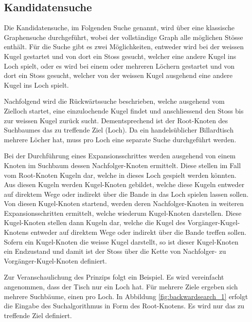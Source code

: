\subsection{Kandidatensuche}\label{sec:kandidatensuche}
Die Kandidatensuche, im Folgenden Suche genannt, wird über eine klassische Graphensuche durchgeführt, wobei der vollständige
Graph alle möglichen Stösse enthält.
Für die Suche gibt es zwei Möglichkeiten, entweder wird bei der weissen Kugel gestartet und von dort ein Stoss gesucht,
welcher eine andere Kugel ins Loch spielt, oder es wird bei einem oder mehreren Löchern gestartet und von dort ein Stoss gesucht,
welcher von der weissen Kugel ausgehend eine andere Kugel ins Loch spielt.

Nachfolgend wird die Rückwärtssuche beschrieben, welche ausgehend vom Zielloch startet, eine einzulochende Kugel findet
und anschliessend den Stoss bis zur weissen Kugel zurück sucht.
Dementsprechend ist der Root-Knoten des Suchbaumes das zu treffende Ziel (Loch).
Da ein handelsüblicher Billardtisch mehrere Löcher hat, muss pro Loch eine separate Suche durchgeführt werden.

Bei der Durchführung eines Expansionsschrittes werden ausgehend von einem Knoten im Suchbaum dessen Nachfolger-Knoten ermittelt.
Diese stellen im Fall vom Root-Knoten Kugeln dar, welche in dieses Loch gespielt werden könnten.
Aus diesen Kugeln werden Kugel-Knoten gebildet, welche diese Kugeln entweder auf direktem Wege oder indirekt über die Bande
in das Loch spielen lassen sollen.
Von diesen Kugel-Knoten startend, werden deren Nachfolger-Knoten in weiteren Expansionsschritten ermittelt, welche
wiederum Kugel-Knoten darstellen.
Diese Kugel-Knoten stellen dann Kugeln dar, welche die Kugel des Vorgänger-Kugel-Knotens entweder auf direktem Wege oder indirekt
über die Bande treffen sollen.
Sofern ein Kugel-Knoten die weisse Kugel darstellt, so ist dieser Kugel-Knoten ein Endzustand und damit ist der Stoss
über die Kette von Nachfolger- zu Vorgänger-Kugel-Knoten definiert.

\newpage
Zur Veranschaulichung des Prinzips folgt ein Beispiel. Es wird vereinfacht angenommen,
dass der Tisch nur ein Loch hat. Für mehrere Ziele ergeben sich mehrere Suchbäume, einen pro Loch.
In Abbildung \ref{fig:backwardsearch_1} erfolgt die Eingabe des Suchalgorithmus in Form des Root-Knotens.
Es wird nur das zu treffende Ziel definiert.

